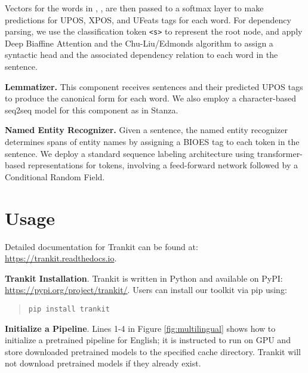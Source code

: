 \documentclass[11pt,a4paper]{article}
\begin{document}
Vectors for the words in , ,  are then passed to a softmax layer to make predictions for UPOS, XPOS, and UFeats tags for each word. For dependency parsing, we use the classification token \texttt{<s>} to represent the root node, and apply Deep Biaffine Attention \citep{dozat2016deep} and the Chu-Liu/Edmonds algorithm \citep{chu1965shortest,edmonds1967optimum} to assign a syntactic head and the associated dependency relation to each word in the sentence.

\vspace{0.3cm}

\noindent \textbf{Lemmatizer.} This component receives sentences and their predicted UPOS tags to produce the canonical form for each word. We also employ a character-based seq2seq model for this component as in Stanza.

\vspace{0.3cm}

\noindent \textbf{Named Entity Recognizer.} Given a sentence, the named entity recognizer determines spans of entity names by assigning a BIOES tag to each token in the sentence. We deploy a standard sequence labeling architecture using transformer-based representations for tokens, involving a feed-forward network followed by a Conditional Random Field.

\section{Usage}

Detailed documentation for Trankit can be found at: \url{https://trankit.readthedocs.io}.

\vspace{0.3cm}

\noindent \textbf{Trankit Installation}. Trankit is written in Python and available on PyPI: \url{https://pypi.org/project/trankit/}. Users can install our toolkit via pip using:


\begin{quote}
    \centering
    \texttt{pip install trankit}
\end{quote}

\noindent \textbf{Initialize a Pipeline}. Lines 1-4 in Figure \ref{fig:multilingual} shows how to initialize a pretrained pipeline for English; it is instructed to run on GPU and store downloaded pretrained models to the specified cache directory. Trankit will not download pretrained models if they already exist.
\end{document}
